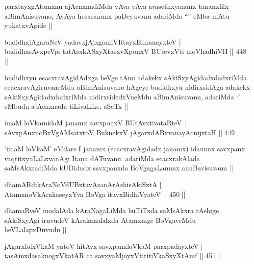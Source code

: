 \begin{artha}
parxtayxgAtamxnu ajAcnxnadiMda yAva yAva avasethxyanunx tananxlilx aBimAnisuvano, AyAya hesaranunx paDeyuvanu adariMda ``\stext'' eMba mAtu yukatxvAgide ||
\end{artha}


\begin{shl}
budidhxjAgaraNeV yadavxjAjxgamiVRtayxBimanayxteV | \\
budidhxsAvxpeV\s pi tatAsxkASxyXtasxvXponxV BUtevxVti moVhadhiVH \hfill||  448 ||  
\end{shl}

\begin{artha}
budidhxyu ecacxravAgidAdxga heVge tAnu adakekx sAkiSxyAgidadxdadxriMda ecacxravAgiruvaneMdu aBimAnisuvano hAgeye budidhxyu nidirxsidAga adakekx sAkiSxyAgidadxdadxriMda nidirxsidedxVneMdu aBimAnisuvanu, adariMda `\stext' eMbudu ajAcnxnada tiLivaLike, aSeTx ||
\end{artha}

\begin{shl}
imaM loVkamidaM janamx savxponxV BUtAvx\s tivataRteV | \\
sAvxpAnxnoBxVgAMsatxtoV BuknekxV jAgarxdABxvanayA\s cnijxtaH \hfill||  449 ||  
\end{shl}

\begin{artha}
`imaM loVkaM' eMdare I janamx (ecacxravAgidadx janamx) idanunx savxpanx vaqtitxyuLaLxvanAgi Itanu dATuvanu. adariMda ecacxrakAlada saMsAkxradiMda kUDidudx savxpanxda BoVgagaLanunx anuBavisuvanu ||
\end{artha}

\begin{shl}
dhamARdikAraNoVdUBxtavAsanArAshisAkiSxtA | \\
AtamxnoV\s kArakaseyxYva BoVga itayxBidhiVyateV \hfill||  450 ||  
\end{shl}

\begin{artha}
dhamaRveV modalAda kAraNagaLiMda huTiTxda saMsAkxra rAshige sAkiSxyAgi iruvudeV kArakanalalxda Atamxnige BoVgaveMdu heVLalapxDuvudu ||
\end{artha}

\begin{shl}
jAgarxlolxVkaM yatoV hitAvx savxpanxloVkaM parxpadayxteV | \\
tasAmxdasaknogxV\s katAR ca savxyaMjoyxVtiritiVkaSxyXtAmf \hfill||  451 ||  
\end{shl}

